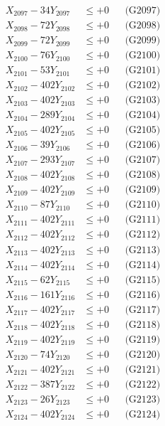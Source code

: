\documentclass[a4paper,10pt]{article}
\begin{document}
{\begin{align}
X_{2097} - 34Y_{2097} &\leq +0 && \text{(G2097)} \\
X_{2098} - 72Y_{2098} &\leq +0 && \text{(G2098)} \\
X_{2099} - 72Y_{2099} &\leq +0 && \text{(G2099)} \\
X_{2100} - 76Y_{2100} &\leq +0 && \text{(G2100)} \\
\allowbreak
X_{2101} - 53Y_{2101} &\leq +0 && \text{(G2101)} \\
X_{2102} - 402Y_{2102} &\leq +0 && \text{(G2102)} \\
X_{2103} - 402Y_{2103} &\leq +0 && \text{(G2103)} \\
X_{2104} - 289Y_{2104} &\leq +0 && \text{(G2104)} \\
X_{2105} - 402Y_{2105} &\leq +0 && \text{(G2105)} \\
X_{2106} - 39Y_{2106} &\leq +0 && \text{(G2106)} \\
X_{2107} - 293Y_{2107} &\leq +0 && \text{(G2107)} \\
X_{2108} - 402Y_{2108} &\leq +0 && \text{(G2108)} \\
X_{2109} - 402Y_{2109} &\leq +0 && \text{(G2109)} \\
X_{2110} - 87Y_{2110} &\leq +0 && \text{(G2110)} \\
\allowbreak
X_{2111} - 402Y_{2111} &\leq +0 && \text{(G2111)} \\
X_{2112} - 402Y_{2112} &\leq +0 && \text{(G2112)} \\
X_{2113} - 402Y_{2113} &\leq +0 && \text{(G2113)} \\
X_{2114} - 402Y_{2114} &\leq +0 && \text{(G2114)} \\
X_{2115} - 62Y_{2115} &\leq +0 && \text{(G2115)} \\
X_{2116} - 161Y_{2116} &\leq +0 && \text{(G2116)} \\
X_{2117} - 402Y_{2117} &\leq +0 && \text{(G2117)} \\
X_{2118} - 402Y_{2118} &\leq +0 && \text{(G2118)} \\
X_{2119} - 402Y_{2119} &\leq +0 && \text{(G2119)} \\
X_{2120} - 74Y_{2120} &\leq +0 && \text{(G2120)} \\
\allowbreak
X_{2121} - 402Y_{2121} &\leq +0 && \text{(G2121)} \\
X_{2122} - 387Y_{2122} &\leq +0 && \text{(G2122)} \\
X_{2123} - 26Y_{2123} &\leq +0 && \text{(G2123)} \\
X_{2124} - 402Y_{2124} &\leq +0 && \text{(G2124)} \\

\end{align}}
\end{document}
